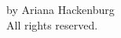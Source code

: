 \documentclass[12pt]{article}
\begin{document}

\clearpage

\vspace*{\fill}
\begin{center}
 by Ariana Hackenburg\\
All rights reserved.
\end{center}
\vspace*{\fill}

\clearpage

\doublespacing

\pagestyle{fancy}%
\fancyhead[C]{}
\renewcommand{\headrulewidth}{0.4pt}%

\tableofcontents
\clearpage

\listoffigures
\setcounter{tocdepth}{3} 

\clearpage
\renewcommand{\thepage}{\arabic{page}}
\setcounter{page}{1}
\end{document}
